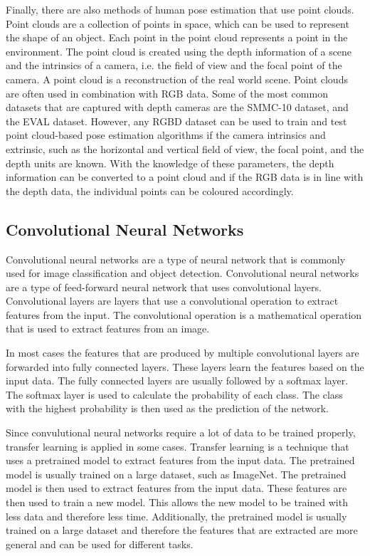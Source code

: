 Finally, there are also methods of human pose estimation that use point clouds. Point clouds are a collection of points in space, which can be used to represent the shape of an object. Each point in the point cloud represents a point in the environment. The point cloud is created using the depth information of a scene and the intrinsics of a camera, i.e. the field of view and the focal point of the camera. A point cloud is a reconstruction of the real world scene. Point clouds are often used in combination with RGB data. Some of the most common datasets that are captured with depth cameras are the SMMC-10 dataset\cite{SMMC10}, and the EVAL dataset\cite{EVAL}. However, any RGBD dataset can be used to train and test point cloud-based pose estimation algorithms if the camera intrinsics and extrinsic, such as the horizontal and vertical field of view, the focal point, and the depth units are known. With the knowledge of these parameters, the depth information can be converted to a point cloud and if the RGB data is in line with the depth data, the individual points can be coloured accordingly.

\subsection{Convolutional Neural Networks}

Convolutional neural networks are a type of neural network that is commonly used for image classification and object detection. Convolutional neural networks are a type of feed-forward neural network that uses convolutional layers. Convolutional layers are layers that use a convolutional operation to extract features from the input. The convolutional operation is a mathematical operation that is used to extract features from an image. 

In most cases the features that are produced by multiple convolutional layers are forwarded into fully connected layers. These layers learn the features based on the input data. The fully connected layers are usually followed by a softmax layer. The softmax layer is used to calculate the probability of each class. The class with the highest probability is then used as the prediction of the network.

Since convulutional neural networks require a lot of data to be trained properly, transfer learning is applied in some cases. Transfer learning is a technique that uses a pretrained model to extract features from the input data. The pretrained model is usually trained on a large dataset, such as ImageNet\cite{ImageNet}. The pretrained model is then used to extract features from the input data. These features are then used to train a new model. This allows the new model to be trained with less data and therefore less time. Additionally, the pretrained model is usually trained on a large dataset and therefore the features that are extracted are more general and can be used for different tasks. 

